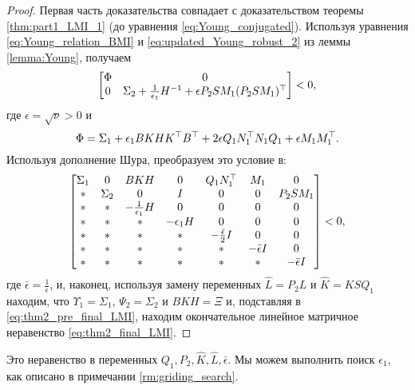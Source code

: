 \begin{proof}
	Первая часть доказательства совпадает с доказательством теоремы \ref{thm:part1_LMI_1} (до уравнения \eqref{eq:Young_conjugated}). Используя уравнения \eqref{eq:Young_relation_BMI} и \eqref{eq:updated_Young_robust_2} из леммы \ref{lemma:Young}, получаем
	\begin{equation}
		\label{eq:thm2_LMI_after_Young}
		\begin{bmatrix}
			{\Phi}  & 0  \\
			0 & {\Sigma}_2 +\frac{1}{\epsilon_1}{H}^{-1} +\epsilon {P}_2{S}{M}_1({P}_2{S}{M}_1)^\top
		\end{bmatrix}<0,
	\end{equation}
	где $\epsilon=\sqrt{\nu}>0$ и
	\begin{equation}
		{\Phi}={\Sigma}_1 
		+\epsilon_1{BKH}{K}^\top{B}^\top+ 2\epsilon {Q}_1{N}_1^\top{N}_1{Q}_1 + \epsilon {M}_1{M}_1^\top.
	\end{equation}
	Используя дополнение Шура, преобразуем это условие в: 
	\begin{equation}
		\label{eq:thm2_pre_final_LMI}
		\begin{bmatrix}
			{\Sigma}_1  & 0 & {BKH} & 0 &  {Q}_1{N}_1^\top & {M}_1 & 0\\
			* & {\Sigma}_2 & 0 & {I} & 0 & 0 & {P}_2{S}{M}_1\\
			* & * &  -\frac{1}{\epsilon_1}{H} & 0 & 0 &0 & 0\\
			* & * & * & -\epsilon_1{H} & 0 & 0 & 0 \\
			* & * & * & * & -\frac{\bar{\epsilon}}{2}{I} & 0 & 0 \\       * & * & * & * & *& -\bar{\epsilon} {I} & 0 \\
			* & * & * & * & *& * & -\bar{\epsilon} {I}\\
		\end{bmatrix} <0,
	\end{equation}
	где $\bar{\epsilon}=\frac{1}{\epsilon}$, и, наконец, используя замену переменных 
	$\hat{{L}}={P}_2{L}$ и $\hat{{K}}={KS}{Q}_1$
	находим, что ${\Upsilon}_1={\Sigma}_1$, ${\Psi}_2={\Sigma}_2$ и ${BKH}={\Xi}$ и, подставляя в \eqref{eq:thm2_pre_final_LMI}, находим окончательное линейное матричное неравенство \eqref{eq:thm2_final_LMI}. 
\end{proof}
Это неравенство в переменных ${Q}_1,{P}_2,\hat{{K}} , \hat{{L}},\bar{\epsilon}$.
Мы можем выполнить поиск $\epsilon_1$, как описано в примечании \ref{rm:griding_search}. 

